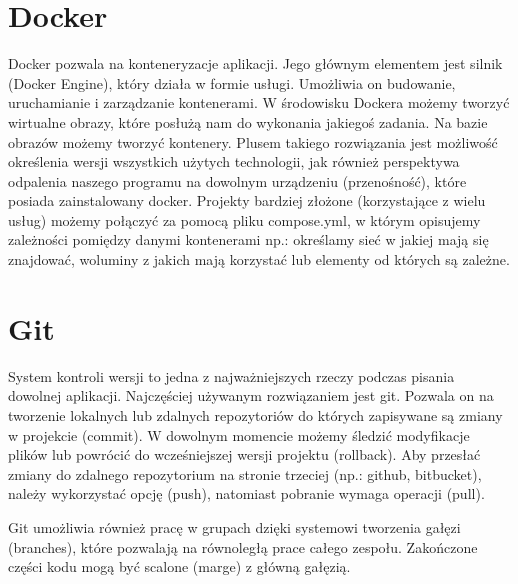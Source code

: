 \section{Docker} 
Docker pozwala na konteneryzacje aplikacji. Jego głównym elementem jest silnik (Docker Engine), który działa w formie usługi. Umożliwia on budowanie, uruchamianie i zarządzanie kontenerami. W środowisku Dockera możemy tworzyć wirtualne obrazy, które posłużą nam do wykonania jakiegoś zadania. Na bazie obrazów możemy tworzyć kontenery. Plusem takiego rozwiązania jest możliwość określenia wersji wszystkich użytych technologii, jak również perspektywa odpalenia naszego programu na dowolnym urządzeniu (przenośność), które posiada zainstalowany docker. Projekty bardziej złożone (korzystające z wielu usług) możemy połączyć za pomocą pliku compose.yml, w którym opisujemy zależności pomiędzy danymi kontenerami np.: określamy sieć w jakiej mają się znajdować, woluminy z jakich mają korzystać lub elementy od których są zależne.
\section{Git}
System kontroli wersji to jedna z najważniejszych rzeczy podczas pisania dowolnej aplikacji. Najczęściej używanym rozwiązaniem jest git. Pozwala on na tworzenie lokalnych lub zdalnych repozytoriów do których zapisywane są zmiany w projekcie (commit). W dowolnym momencie możemy śledzić modyfikacje plików lub powrócić do wcześniejszej wersji projektu (rollback). Aby przesłać zmiany do zdalnego repozytorium na stronie trzeciej (np.: github, bitbucket), należy wykorzystać opcję (push), natomiast pobranie wymaga operacji (pull). 

Git umożliwia również pracę w grupach dzięki systemowi tworzenia gałęzi (branches), które pozwalają na równoległą prace całego zespołu. Zakończone części kodu mogą być scalone (marge) z główną gałęzią.
